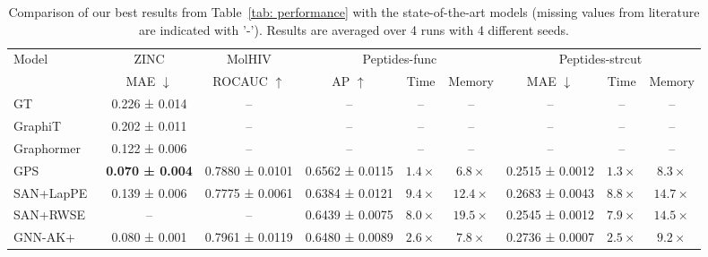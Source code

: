 \documentclass{article}
\begin{document}
\begin{table}[t]
    \centering
    \caption{Comparison of our best results from Table~\ref{tab: performance} with the state-of-the-art models (missing values from literature are indicated with '-').  Results are averaged over 4 runs with 4 different seeds. %
    }
    \label{tab: sota}
    \scriptsize
    \begin{tabular}{lcccccccc}
    \toprule
         \multirow{2}{*}{Model} 
         & ZINC 
         & MolHIV 
         & \multicolumn{3}{c}{Peptides-func} 
         & \multicolumn{3}{c}{Peptides-strcut} \\
         \cmidrule(lr){2-2}
         \cmidrule(lr){3-3}
         \cmidrule(lr){4-6}
         \cmidrule(lr){7-9}
           & MAE $\downarrow$  %
           & ROCAUC $\uparrow$ %
           & {AP $\uparrow$ } %
           & {Time} %
           & {Memory } %
           & {MAE $\downarrow$ }       %
           & {Time} %
           & {Memory} %
           \\
         \midrule
         GT~\citep{dwivedi2020benchmarking} & 
         0.226 ± 0.014 %
         & -- %
         & --& --& --%
         & --& --& --\\%
         GraphiT~\citep{mialon2021graphit} & 
         0.202 ± 0.011 %
         & -- %
         & --& --& --%
         & --& --& --\\%
         Graphormer~\citep{ying2021graphormer} 
         & 0.122 ± 0.006 %
         & -- %
         & --& --& --%
         & --& --& --\\%
         GPS~\citep{rampavsek2022recipe}
         & \bf 0.070 ± 0.004 %
         & 0.7880 ± 0.0101 %
         & 0.6562 ± 0.0115 %
         & $1.4\times$
         & $6.8\times$
         & 0.2515 ± 0.0012  %
         & $1.3\times$
         & $8.3\times$\\
         SAN+LapPE~\citep{kreuzer2021rethinking} 
         & 0.139 ± 0.006 %
         & 0.7775 ± 0.0061 %
         & 0.6384 ± 0.0121 
         & $9.4\times$ & $12.4\times$
         & 0.2683 ± 0.0043 
         & $8.8\times$ &  $14.7\times$ \\
         SAN+RWSE~\citep{kreuzer2021rethinking} 
         & --
         & --
         & 0.6439 ± 0.0075 
         & $8.0\times$ & $19.5\times$ 
         & 0.2545 ± 0.0012 
         & $7.9\times$ &  $14.5\times$\\
         \midrule
         GNN-AK+~\citep{zhao2021stars}
         & {0.080 ± 0.001} %
         & {0.7961 ± 0.0119} %
         &  0.6480 ± 0.0089 
         & $2.6\times$& $7.8\times$
         & 0.2736 ± 0.0007  
         & $2.5\times$& $9.2\times$ \\
         

\end{tabular}
\end{table}
\end{document}
